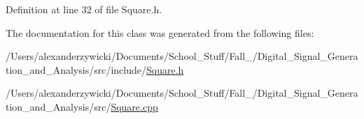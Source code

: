 Definition at line 32 of file Square.\-h.



The documentation for this class was generated from the following files\-:\begin{DoxyCompactItemize}
\item 
/\-Users/alexanderzywicki/\-Documents/\-School\-\_\-\-Stuff/\-Fall\-\_/\-Digital\-\_\-\-Signal\-\_\-\-Generation\-\_\-and\-\_\-\-Analysis/src/include/\hyperlink{Square_8h}{Square.\-h}\item 
/\-Users/alexanderzywicki/\-Documents/\-School\-\_\-\-Stuff/\-Fall\-\_/\-Digital\-\_\-\-Signal\-\_\-\-Generation\-\_\-and\-\_\-\-Analysis/src/\hyperlink{Square_8cpp}{Square.\-cpp}\end{DoxyCompactItemize}
